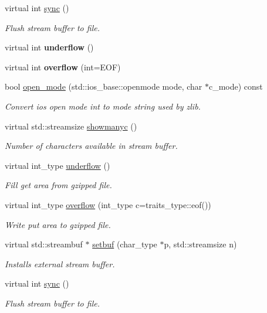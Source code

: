 \begin{DoxyCompactItemize}
virtual int \hyperlink{classgzfilebuf_a8fdf6b079487c0034cb920c63c9eaf55}{sync} ()
\begin{DoxyCompactList}\small\item\em Flush stream buffer to file. \end{DoxyCompactList}\item 
\mbox{\label{classgzfilebuf_ae04ecb5dfa903835d091fbec23b4ee40}} 
virtual int {\bfseries underflow} ()
\item 
\mbox{\label{classgzfilebuf_a9ee18f08c603797ea6ff7565a64a9fbc}} 
virtual int {\bfseries overflow} (int=E\+OF)
\item 
bool \hyperlink{classgzfilebuf_ab0c2c304183e591706681af26add3da2}{open\+\_\+mode} (std\+::ios\+\_\+base\+::openmode mode, char $\ast$c\+\_\+mode) const
\begin{DoxyCompactList}\small\item\em Convert ios open mode int to mode string used by zlib. \end{DoxyCompactList}\item 
virtual std\+::streamsize \hyperlink{classgzfilebuf_aa6c80a4f96fdc5e4a991113699428164}{showmanyc} ()
\begin{DoxyCompactList}\small\item\em Number of characters available in stream buffer. \end{DoxyCompactList}\item 
virtual int\+\_\+type \hyperlink{classgzfilebuf_a23768f9935022e54608c53173f0047c0}{underflow} ()
\begin{DoxyCompactList}\small\item\em Fill get area from gzipped file. \end{DoxyCompactList}\item 
virtual int\+\_\+type \hyperlink{classgzfilebuf_a118cfb494fca6d5ce4d08447ea1fff2b}{overflow} (int\+\_\+type c=traits\+\_\+type\+::eof())
\begin{DoxyCompactList}\small\item\em Write put area to gzipped file. \end{DoxyCompactList}\item 
virtual std\+::streambuf $\ast$ \hyperlink{classgzfilebuf_a11ff58ab8f4de52cf496892b3a97827e}{setbuf} (char\+\_\+type $\ast$p, std\+::streamsize n)
\begin{DoxyCompactList}\small\item\em Installs external stream buffer. \end{DoxyCompactList}\item 
virtual int \hyperlink{classgzfilebuf_a8fdf6b079487c0034cb920c63c9eaf55}{sync} ()
\begin{DoxyCompactList}\small\item\em Flush stream buffer to file. \end{DoxyCompactList}\end{DoxyCompactItemize}


